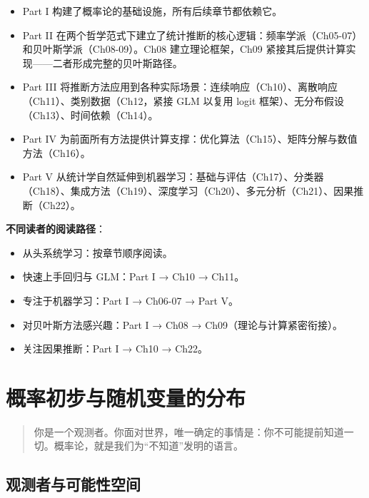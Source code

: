 \documentclass[
]{book}
\providecommand{\tightlist}{%
  \setlength{\itemsep}{0pt}\setlength{\parskip}{0pt}}
\begin{document}
\begin{itemize}
\tightlist
\item
  Part I 构建了概率论的基础设施，所有后续章节都依赖它。
\item
  Part II 在两个哲学范式下建立了统计推断的核心逻辑：频率学派（Ch05-07）和贝叶斯学派（Ch08-09）。Ch08 建立理论框架，Ch09 紧接其后提供计算实现------二者形成完整的贝叶斯路径。
\item
  Part III 将推断方法应用到各种实际场景：连续响应（Ch10）、离散响应（Ch11）、类别数据（Ch12，紧接 GLM 以复用 logit 框架）、无分布假设（Ch13）、时间依赖（Ch14）。
\item
  Part IV 为前面所有方法提供计算支撑：优化算法（Ch15）、矩阵分解与数值方法（Ch16）。
\item
  Part V 从统计学自然延伸到机器学习：基础与评估（Ch17）、分类器（Ch18）、集成方法（Ch19）、深度学习（Ch20）、多元分析（Ch21）、因果推断（Ch22）。
\end{itemize}

\textbf{不同读者的阅读路径}：

\begin{itemize}
\tightlist
\item
  从头系统学习：按章节顺序阅读。
\item
  快速上手回归与 GLM：Part I → Ch10 → Ch11。
\item
  专注于机器学习：Part I → Ch06-07 → Part V。
\item
  对贝叶斯方法感兴趣：Part I → Ch08 → Ch09（理论与计算紧密衔接）。
\item
  关注因果推断：Part I → Ch10 → Ch22。
\end{itemize}

\mainmatter

\chapter{概率初步与随机变量的分布}\label{ux6982ux7387ux521dux6b65ux4e0eux968fux673aux53d8ux91cfux7684ux5206ux5e03}

\begin{quote}
你是一个观测者。你面对世界，唯一确定的事情是：你不可能提前知道一切。概率论，就是我们为``不知道''发明的语言。
\end{quote}

\section{观测者与可能性空间}\label{ux89c2ux6d4bux8005ux4e0eux53efux80fdux6027ux7a7aux95f4}
\end{document}
